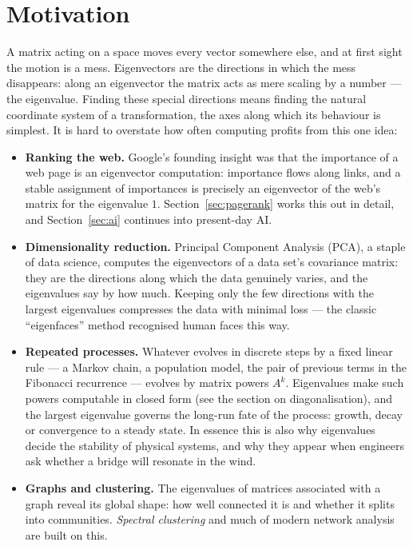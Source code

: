 \section{Motivation}

A matrix acting on a space moves every vector somewhere else, and at first sight the motion is a mess.
Eigenvectors are the directions in which the mess disappears: along an eigenvector the matrix acts as mere
scaling by a number — the eigenvalue. Finding these special directions means finding the natural
coordinate system of a transformation, the axes along which its behaviour is simplest. It is hard to
overstate how often computing profits from this one idea:

\begin{itemize}
\item \textbf{Ranking the web.} Google's founding insight was that the importance of a web page is an
eigenvector computation: importance flows along links, and a stable assignment of importances is precisely
an eigenvector of the web's matrix for the eigenvalue $1$. Section~\ref{sec:pagerank} works this out in
detail, and Section~\ref{sec:ai} continues into present-day AI.
\item \textbf{Dimensionality reduction.} Principal Component Analysis (PCA), a staple of data science,
computes the eigenvectors of a data set's covariance matrix: they are the directions along which the data
genuinely varies, and the eigenvalues say by how much. Keeping only the few directions with the largest
eigenvalues compresses the data with minimal loss — the classic ``eigenfaces'' method recognised human
faces this way.
\item \textbf{Repeated processes.} Whatever evolves in discrete steps by a fixed linear rule — a Markov
chain, a population model, the pair of previous terms in the Fibonacci recurrence — evolves by matrix
powers $A^k$. Eigenvalues make such powers computable in closed form (see the section on diagonalisation),
and the largest eigenvalue governs the long-run fate of the process: growth, decay or convergence to a
steady state. In essence this is also why eigenvalues decide the stability of physical systems, and why
they appear when engineers ask whether a bridge will resonate in the wind.
\item \textbf{Graphs and clustering.} The eigenvalues of matrices associated with a graph reveal its
global shape: how well connected it is and whether it splits into communities. \emph{Spectral clustering}
and much of modern network analysis are built on this.
\end{itemize}

